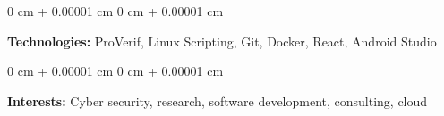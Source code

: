 \documentclass[10pt, a4paper]{article}
\newenvironment{onecolentry}{
    \begin{adjustwidth}{
        0 cm + 0.00001 cm
    }{
        0 cm + 0.00001 cm
    }
}{
    \end{adjustwidth}
} %
\begin{document}
        \vspace{0.2 cm}

        \begin{onecolentry}
            \textbf{Technologies:} ProVerif, Linux Scripting, Git, Docker, React, Android Studio
        \end{onecolentry}

        \vspace{0.2 cm}

        \begin{onecolentry}
            \textbf{Interests:} Cyber security, research, software development, consulting, cloud
        \end{onecolentry}


    
\end{document}
